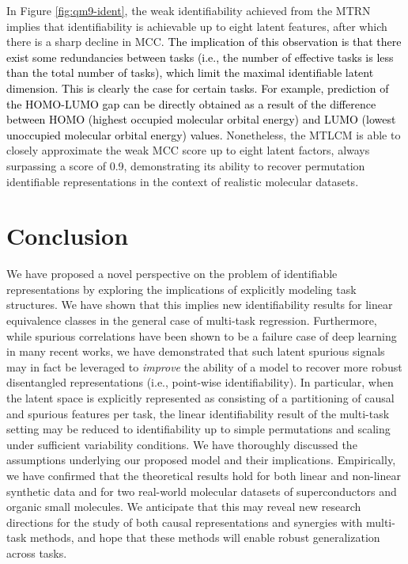\documentclass[10pt]{article} %
\theoremstyle{plain}
\theoremstyle{definition}
\begin{document}
In Figure \ref{fig:qm9-ident}, the weak identifiability achieved from the MTRN implies that identifiability is achievable up to eight latent features, after which there is a sharp decline in MCC. \textcolor{black}{The implication of this observation is that there exist some redundancies between tasks (i.e., the number of effective tasks is less than the total number of tasks), which limit the maximal identifiable latent dimension. This is clearly the case for certain tasks. For example, prediction of the HOMO-LUMO gap can be directly obtained as a result of the difference between HOMO (highest occupied molecular orbital energy) and LUMO (lowest unoccupied molecular orbital energy) values.} Nonetheless, the MTLCM is able to closely approximate the weak MCC score up to eight latent factors, always surpassing a score of 0.9, demonstrating its ability to recover permutation identifiable representations in the context of realistic molecular datasets.

\section{Conclusion}\label{sec:conclusion}
We have proposed a novel perspective on the problem of identifiable representations by exploring the implications of explicitly modeling task structures. We have shown that this 
implies new identifiability results for linear equivalence classes in the general case of multi-task regression. Furthermore, while spurious correlations have been shown to be a
failure case of deep learning in many recent works, we have demonstrated that such latent spurious signals may in fact be leveraged to \textit{improve} the ability of a model to recover more robust disentangled representations (i.e., point-wise identifiability). In particular, when the latent space is explicitly represented as consisting of a partitioning of causal and spurious features per task, the linear identifiability result
of the multi-task setting may be reduced to identifiability up to simple permutations and scaling under sufficient variability conditions. We have thoroughly discussed the assumptions underlying our proposed model and their implications. Empirically, we have confirmed that the theoretical results hold for both linear and non-linear synthetic data and for two real-world molecular datasets of superconductors and organic small molecules.
We anticipate that this may reveal new research directions for the study of both causal representations and synergies with multi-task methods, and hope that these methods will enable robust generalization across tasks.
\end{document}
